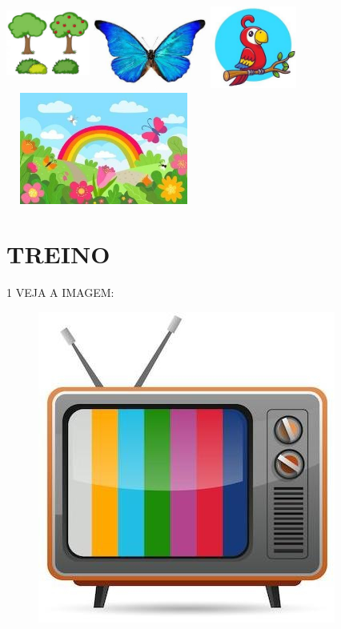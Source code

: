 \includegraphics[width=1.08333in,height=1.19792in]{media/image110.jpg}
\includegraphics[width=1.47778in,height=0.91667in]{media/image111.jpg}
\includegraphics[width=1.11458in,height=1.08403in]{media/image112.jpg}
\includegraphics[width=2.53125in,height=1.44792in]{media/image113.jpg}


\pagebreak

\section{TREINO}


\num{1} VEJA A IMAGEM:

\begin{figure}[htpb!]
\centering
\includegraphics[width=.6\textwidth]{media/image123.jpg}
\end{figure}

